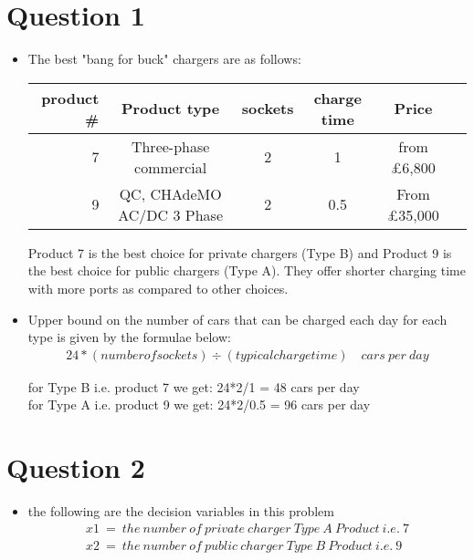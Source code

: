 \documentclass[12pt,letterpaper]{article}
\begin{document}
\section*{Question 1}
\begin{itemize}
    \item The best "bang for buck" chargers are as follows:
        \begin{center}
            \begin{tabular}{r|ccccc}
                 product \# & Product type & sockets & charge time  & Price \\ \hline
                 7 & Three-phase commercial & 2 & 1 & from £6,800 \\
                 9 & QC, CHAdeMO AC/DC 3 Phase & 2 & 0.5 & From £35,000 \\ 
            \end{tabular}
        \end{center}
    Product 7 is the best choice for private chargers (Type B) and Product 9 is the best choice for public chargers (Type A).
    They offer shorter charging time with more ports as compared to other choices.
    \item Upper bound on the number of cars that can be charged each day for each type is given by the formulae below: \\
        \begin{align}
            24*(number of sockets) \div (typical charge time)  \quad cars\ per \ day
        \end{align}
        
        for Type B i.e. product 7 we get: 24*2/1 = 48 cars per day \\
        for Type A i.e. product 9 we get: 24*2/0.5 = 96 cars per day
\end{itemize}

\section*{Question 2}
\begin{itemize}
    \item the following are the decision variables in this problem
        \begin{align}
            x1\ =\ the\ number\ of\ private\ charger\ Type\ A\ Product\ i.e.\ 7 \\
            x2\ =\ the\ number\ of\ public\ charger\ Type\ B\ Product\ i.e.\ 9
        \end{align}
\end{itemize}
\end{document}
